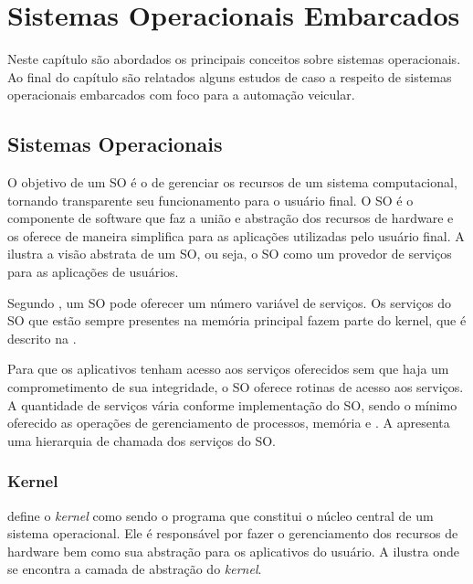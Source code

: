 \chapter{Sistemas Operacionais Embarcados}

Neste capítulo são abordados os principais conceitos sobre sistemas operacionais. Ao final do capítulo são relatados alguns estudos de caso a respeito de sistemas operacionais embarcados com foco para a automação veicular.

\section{Sistemas Operacionais}

O objetivo de um SO é o de gerenciar os recursos de um sistema computacional, tornando transparente seu funcionamento para o usuário final. O SO é o componente de software que faz a união e abstração dos recursos de hardware e os oferece de maneira simplifica para as aplicações utilizadas pelo usuário final. A  ilustra a visão abstrata de um SO, ou seja, o SO como um provedor de serviços para as aplicações de usuários.


Segundo , um SO pode oferecer um número variável de serviços. Os serviços do SO que estão sempre presentes na memória principal fazem parte do kernel, que é descrito na . 

Para que os aplicativos tenham acesso aos serviços oferecidos sem que haja um comprometimento de sua integridade, o SO oferece rotinas de acesso aos serviços. A quantidade de serviços vária conforme implementação do SO, sendo o mínimo oferecido as operações de gerenciamento de processos, memória e . A  apresenta uma hierarquia de chamada dos serviços do SO.


\subsection{Kernel}
\label{cap:os_kernel}

 define o \emph{kernel} como sendo o programa que constitui o núcleo central de um sistema operacional. Ele é responsável por fazer o gerenciamento dos recursos de hardware bem como sua abstração para os aplicativos do usuário. A  ilustra onde se encontra a camada de abstração do \emph{kernel}.

